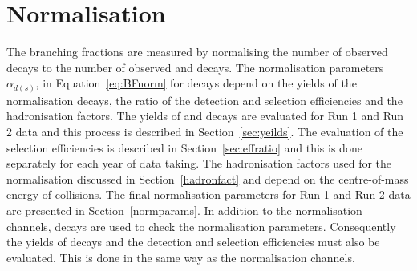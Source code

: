{{\section{Normalisation}
\label{sec:Normalisation}

The \bmumu branching fractions are measured by normalising the number of observed \bmumu decays to the number of observed \bujpsik and \bdkpi decays. 
The normalisation parameters $\alpha_{d(s)}$, in Equation~\ref{eq:BFnorm} for \bmumu decays depend on the yields of the normalisation decays, the ratio of the detection and selection efficiencies and the hadronisation factors. 
The yields of \bujpsik and \bdkpi decays are evaluated for Run 1 and Run 2 data and this process is described in Section~\ref{sec:yeilds}. 
The evaluation of the selection efficiencies is described in Section~\ref{sec:effratio} and this is done separately for each year of data taking.
The hadronisation factors used for the normalisation discussed in Section~\ref{hadronfact} and depend on the centre-of-mass energy of collisions.
The final normalisation parameters for Run 1 and Run 2 data are presented in Section~\ref{normparams}.
In addition to the normalisation channels, \bsjpsiphi decays are used to check the normalisation parameters. Consequently the yields of \bsjpisphi decays and the detection and selection efficiencies must also be evaluated. This is done in the same way as the normalisation channels.





}}
